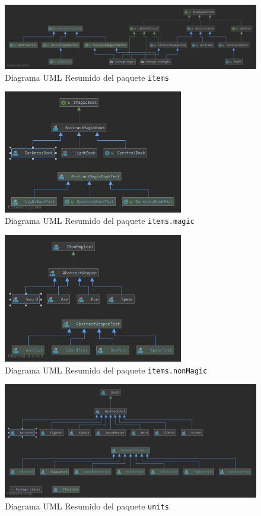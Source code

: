 \documentclass[letterpaper,12pt]{article}
\theoremstyle{plain}
\theoremstyle{definition}
\begin{document}
\begin{figure}[h]
\caption{Diagrama UML Resumido del paquete \texttt{items}}
\centering
\includegraphics[width=\textwidth]{UML/PackageItems.png}
\end{figure}

\begin{figure}[h]
\caption{Diagrama UML Resumido del paquete \texttt{items.magic}}
\centering
\includegraphics[width=0.7\textwidth]{UML/PackageMagic.png}
\end{figure}

\begin{figure}[h]
\caption{Diagrama UML Resumido del paquete \texttt{items.nonMagic}}
\centering
\includegraphics[width=0.7\textwidth]{UML/PackageNonMagic.png}
\end{figure}


\begin{figure}[h]
\caption{Diagrama UML Resumido del paquete \texttt{units}}
\centering
\includegraphics[width=\textwidth]{UML/PackageUnits.png}
\end{figure}
\end{document}
